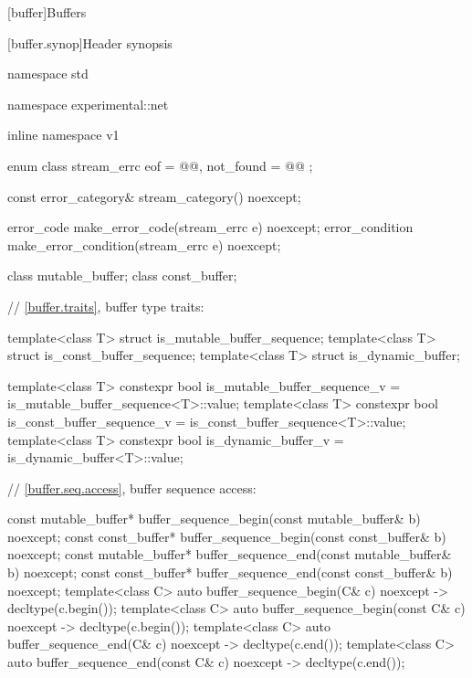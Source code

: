 
[buffer]{Buffers}


%
[buffer.synop]{Header  synopsis}

%
%
%
%
\begin{codeblock}
namespace std {
namespace experimental::net {
inline namespace v1 {

  enum class stream_errc {
    eof = @@,
    not_found = @@
  };

  const error_category& stream_category() noexcept;

  error_code make_error_code(stream_errc e) noexcept;
  error_condition make_error_condition(stream_errc e) noexcept;

  class mutable_buffer;
  class const_buffer;

  // \ref{buffer.traits}, buffer type traits:

  template<class T> struct is_mutable_buffer_sequence;
  template<class T> struct is_const_buffer_sequence;
  template<class T> struct is_dynamic_buffer;

  template<class T>
    constexpr bool is_mutable_buffer_sequence_v = is_mutable_buffer_sequence<T>::value;
  template<class T>
    constexpr bool is_const_buffer_sequence_v = is_const_buffer_sequence<T>::value;
  template<class T>
    constexpr bool is_dynamic_buffer_v = is_dynamic_buffer<T>::value;

  // \ref{buffer.seq.access}, buffer sequence access:

  const mutable_buffer* buffer_sequence_begin(const mutable_buffer& b) noexcept;
  const const_buffer* buffer_sequence_begin(const const_buffer& b) noexcept;
  const mutable_buffer* buffer_sequence_end(const mutable_buffer& b) noexcept;
  const const_buffer* buffer_sequence_end(const const_buffer& b) noexcept;
  template<class C> auto buffer_sequence_begin(C& c) noexcept -> decltype(c.begin());
  template<class C> auto buffer_sequence_begin(const C& c) noexcept -> decltype(c.begin());
  template<class C> auto buffer_sequence_end(C& c) noexcept -> decltype(c.end());
  template<class C> auto buffer_sequence_end(const C& c) noexcept -> decltype(c.end());

}}}
\end{codeblock}

